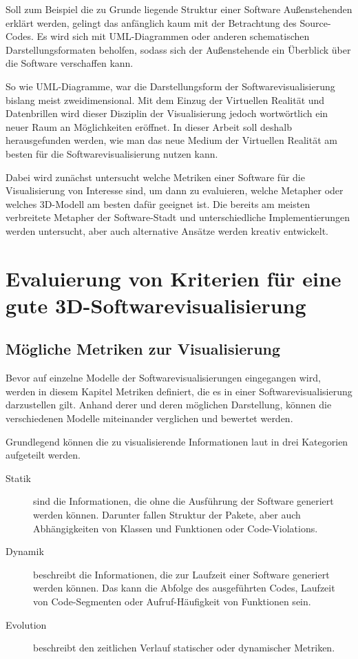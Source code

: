 Soll zum Beispiel die zu Grunde liegende Struktur einer Software Außenstehenden erklärt werden, gelingt das anfänglich kaum mit der Betrachtung des Source-Codes. Es wird sich mit UML-Diagrammen oder anderen schematischen Darstellungsformaten beholfen, sodass sich der Außenstehende ein Überblick über die Software verschaffen kann.

So wie UML-Diagramme, war die Darstellungsform der Softwarevisualisierung bislang meist zweidimensional. Mit dem Einzug der Virtuellen Realität und Datenbrillen wird dieser Disziplin der Visualisierung jedoch wortwörtlich ein neuer Raum an Möglichkeiten eröffnet. In dieser Arbeit soll deshalb herausgefunden werden, wie man das neue Medium der Virtuellen Realität am besten für die Softwarevisualisierung nutzen kann. 

Dabei wird zunächst untersucht welche Metriken einer Software für die Visualisierung von Interesse sind, um dann zu evaluieren, welche Metapher oder welches 3D-Modell am besten dafür geeignet ist. Die bereits am meisten verbreitete Metapher der Software-Stadt und unterschiedliche Implementierungen werden untersucht, aber auch alternative Ansätze werden kreativ entwickelt.

\section{Evaluierung von Kriterien für eine gute 3D-Softwarevisualisierung}
\subsection{Mögliche Metriken zur Visualisierung}
\label{subsec:metrics}

Bevor auf einzelne Modelle der Softwarevisualisierungen eingegangen wird, werden in diesem Kapitel Metriken definiert, die es in einer Softwarevisualisierung darzustellen gilt. Anhand derer und deren möglichen Darstellung, können die verschiedenen Modelle miteinander verglichen und bewertet werden.

Grundlegend können die zu visualisierende Informationen laut \cite{diehl2007software} in drei Kategorien aufgeteilt werden.

\begin{description}
  \item[Statik] sind die Informationen, die ohne die Ausführung der Software generiert werden können. Darunter fallen Struktur der Pakete, aber auch Abhängigkeiten von Klassen und Funktionen oder Code-Violations.
  \item[Dynamik] beschreibt die Informationen, die zur Laufzeit einer Software generiert werden können. Das kann die Abfolge des ausgeführten Codes, Laufzeit von Code-Segmenten oder Aufruf-Häufigkeit von Funktionen sein.
  \item[Evolution] beschreibt den zeitlichen Verlauf statischer oder dynamischer Metriken.
\end{description}

